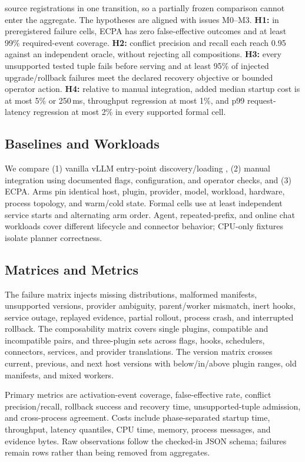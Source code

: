\documentclass[letterpaper,twocolumn,10pt]{article}
\newcommand{\system}{\textsc{ECPA}\xspace}
\begin{document}
source registrations in one transition, so a partially frozen comparison
cannot enter the aggregate.
The hypotheses are aligned with issues M0--M3.  \textbf{H1:} in preregistered
failure cells, \system has zero
false-effective outcomes and at least 99\% required-event coverage.
\textbf{H2:} conflict precision and recall each reach 0.95 against an
independent oracle, without rejecting all compositions.  \textbf{H3:} every
unsupported tested tuple fails before serving and at least 95\% of injected
upgrade/rollback failures meet the declared recovery objective or bounded
operator action.  \textbf{H4:} relative to manual integration, added median
startup cost is at most 5\% or 250\,ms, throughput regression at most 1\%, and
p99 request-latency regression at most 2\% in every supported formal cell.

\subsection{Baselines and Workloads}
We compare (1) vanilla vLLM entry-point discovery/loading
\cite{vllm-plugin,vllm-arch}, (2) manual integration using documented flags,
configuration, and operator checks, and (3) \system.  Arms pin identical host,
plugin, provider, model, workload, hardware, process topology, and warm/cold
state.  Formal cells use at least \ECPAMinimumStarts{} independent service starts and
alternating arm order.  Agent, repeated-prefix, and online chat workloads cover
different lifecycle and connector behavior; CPU-only fixtures isolate planner
correctness.

\subsection{Matrices and Metrics}
The failure matrix injects missing distributions, malformed manifests,
unsupported versions, provider ambiguity, parent/worker mismatch, inert hooks,
service outage, replayed evidence, partial rollout, process crash, and
interrupted rollback.  The composability matrix covers single plugins,
compatible and incompatible pairs, and three-plugin sets across flags, hooks,
schedulers, connectors, services, and provider translations.  The version
matrix crosses current, previous, and next host versions with below/in/above
plugin ranges, old manifests, and mixed workers.

Primary metrics are activation-event coverage, false-effective rate, conflict
precision/recall, rollback success and recovery time, unsupported-tuple
admission, and cross-process agreement.  Costs include phase-separated startup
time, throughput, latency quantiles, CPU time, memory, process messages, and
evidence bytes.  Raw observations follow the checked-in JSON schema; failures
remain rows rather than being removed from aggregates.
\end{document}

